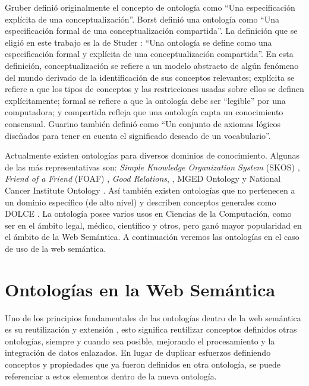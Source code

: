 Gruber\cite{gruber1993translation} definió originalmente el concepto de ontología como “Una especificación explícita de una conceptualización”. Borst \cite{borst1997construction} definió una ontología como “Una especificación formal de una conceptualización compartida”. La definición que se eligió en este trabajo es la de Studer \cite{studer1998knowledge}: “Una ontología se define como una especificación formal y explícita de una conceptualización compartida”.  En esta definición, conceptualización se refiere a un modelo abstracto de algún fenómeno del mundo derivado de la identificación de sus conceptos relevantes; explícita se refiere a que los tipos de conceptos y las restricciones usadas sobre ellos se definen explícitamente; formal se refiere a que la ontología debe ser “legible” por una computadora; y compartida refleja que una ontología capta un conocimiento consensual. Guarino\cite{guarino1998formal} también definió como “Un conjunto de axiomas lógicos diseñados para tener en cuenta el significado deseado de un vocabulario”.

Actualmente existen ontologías para diversos dominios de conocimiento. Algunas de las más representativas son: \textit{Simple Knowledge Organization System} (SKOS) \cite{isaac2009skos}, \textit{ Friend of a Friend} (FOAF) \cite{brickley2012foaf}, \textit{Good Relations}, \cite{hepp2008goodrelations}, MGED Ontology \cite{whetzel2006mged} y National Cancer Institute Ontology \cite{golbeck2011national}. Así también existen ontologías que no pertenecen a un dominio específico (de alto nivel) y describen conceptos generales como DOLCE\cite{dolce} \cite{Masolo02thewonderweb}.
La ontología posee varios usos en Ciencias de la Computación, como ser en el ámbito legal, médico, científico y otros, pero ganó mayor popularidad en el ámbito de la Web Semántica. A continuación veremos las ontologías en el caso de uso de la web semántica.


\section{Ontologías en la Web Semántica}
Uno de los principios fundamentales de las ontologías dentro de la web semántica es su reutilización y extensión \cite{Thorsen2015OntologiesIT}, esto significa reutilizar conceptos definidos otras ontologías, siempre y cuando sea posible, mejorando el procesamiento y la integración de datos enlazados. En lugar de duplicar esfuerzos definiendo conceptos y propiedades que ya fueron definidos en otra ontología, se puede referenciar a estos elementos dentro de la nueva ontología. 


